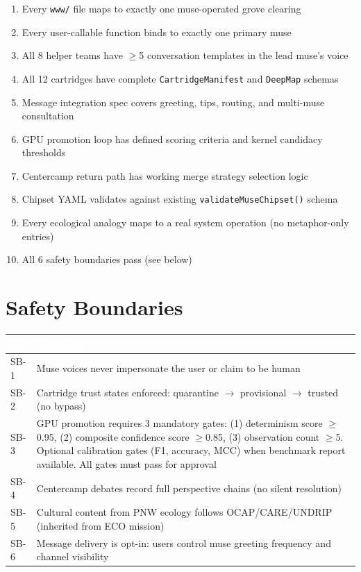 \documentclass[11pt,letterpaper]{article}
\newcommand{\tableheader}[1]{\textbf{\sffamily\textcolor{white}{#1}}}
\begin{document}
\begin{enumerate}[leftmargin=2em]
\item Every \texttt{www/} file maps to exactly one muse-operated grove clearing
\item Every user-callable function binds to exactly one primary muse
\item All 8 helper teams have $\geq$5 conversation templates in the lead muse's voice
\item All 12 cartridges have complete \texttt{CartridgeManifest} and \texttt{DeepMap} schemas
\item Message integration spec covers greeting, tips, routing, and multi-muse consultation
\item GPU promotion loop has defined scoring criteria and kernel candidacy thresholds
\item Centercamp return path has working merge strategy selection logic
\item Chipset YAML validates against existing \texttt{validateMuseChipset()} schema
\item Every ecological analogy maps to a real system operation (no metaphor-only entries)
\item All 6 safety boundaries pass (see below)
\end{enumerate}

\section{Safety Boundaries}

\begin{center}
\begin{tabularx}{\textwidth}{C{1.2cm}X}
\toprule
{}
\tableheader{ID} & \tableheader{Boundary} \\
\midrule
SB-1 & Muse voices never impersonate the user or claim to be human \\
SB-2 & Cartridge trust states enforced: quarantine $\rightarrow$ provisional $\rightarrow$ trusted (no bypass) \\
SB-3 & GPU promotion requires 3 mandatory gates: (1) determinism score $\geq$0.95, (2) composite confidence score $\geq$0.85, (3) observation count $\geq$5. Optional calibration gates (F1, accuracy, MCC) when benchmark report available. All gates must pass for approval \\
SB-4 & Centercamp debates record full perspective chains (no silent resolution) \\
SB-5 & Cultural content from PNW ecology follows OCAP/CARE/UNDRIP (inherited from ECO mission) \\
SB-6 & Message delivery is opt-in: users control muse greeting frequency and channel visibility \\
\bottomrule
\end{tabularx}
\end{center}
\end{document}
